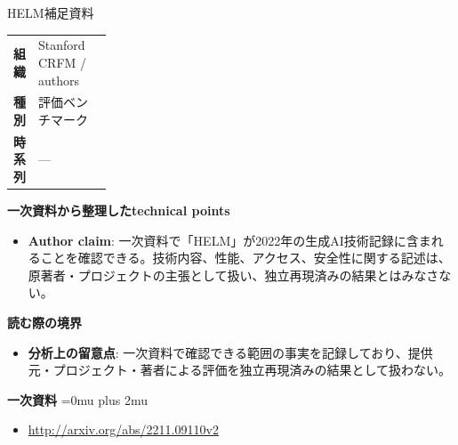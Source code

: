 \begin{technicalnote}{HELM}{補足資料}
\begingroup
\begin{tabularx}{\linewidth}{@{}>{\bfseries}p{0.22\linewidth}X@{}}
組織 & Stanford CRFM / authors \\
種別 & 評価ベンチマーク \\
時系列 & — \\
\end{tabularx}
\smallskip
{\bfseries 一次資料から整理したtechnical points}
\begin{itemize}[leftmargin=1.5em,itemsep=0.35em]
\item \textbf{Author claim}: 一次資料で「HELM」が2022年の生成AI技術記録に含まれることを確認できる。技術内容、性能、アクセス、安全性に関する記述は、原著者・プロジェクトの主張として扱い、独立再現済みの結果とはみなさない。
\end{itemize}
\begin{minipage}{\linewidth}
{\bfseries 読む際の境界}
\begin{itemize}[leftmargin=1.5em,itemsep=0.35em]
\item \textbf{分析上の留意点}: 一次資料で確認できる範囲の事実を記録しており、提供元・プロジェクト・著者による評価を独立再現済みの結果として扱わない。
\end{itemize}
\begin{samepage}
{\bfseries 一次資料}
\begingroup\sloppy
\Urlmuskip=0mu plus 2mu\relax
\begin{itemize}[leftmargin=1.5em,itemsep=0.25em]
\item {\scriptsize\url{http://arxiv.org/abs/2211.09110v2}}
\end{itemize}
\endgroup
\end{samepage}
\end{minipage}
\endgroup
\end{technicalnote}
\medskip
